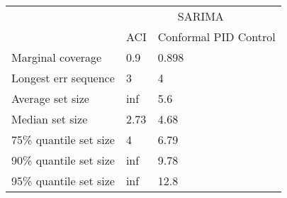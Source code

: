 \begin{tabular}{lll}
\toprule
& \multicolumn{2}{c}{SARIMA} \\
& ACI & Conformal PID Control \\
\midrule
Marginal coverage & 0.9 & 0.898 \\
Longest err sequence & 3 & 4 \\
Average set size & inf & 5.6 \\
Median set size & 2.73 & 4.68 \\
75\% quantile set size & 4 & 6.79 \\
90\% quantile set size & inf & 9.78 \\
95\% quantile set size & inf & 12.8 \\
\bottomrule
\end{tabular}
